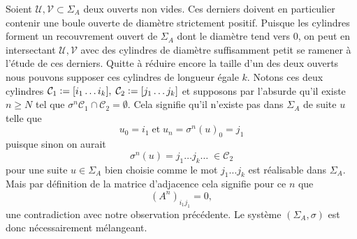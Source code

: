 \documentclass[12pt]{article}
\newcommand{\defeq}{\vcentcolon=}
\begin{document}
Soient $\mathcal{U}, \mathcal{V} \subset \Sigma_{A}$ deux ouverts non vides. Ces derniers doivent en particulier contenir une boule ouverte de diamètre strictement positif. Puisque les cylindres forment un recouvrement ouvert de $\Sigma_{A}$ dont le diamètre tend vers 0, on peut en intersectant $\mathcal{U}, \mathcal{V}$ avec des cylindres de diamètre suffisamment petit se ramener à l'étude de ces derniers. Quitte à réduire encore la taille d'un des deux ouverts nous pouvons supposer ces cylindres de longueur égale $k$. Notons ces deux cylindres $ \mathcal{C}_{1} \defeq [i_{1}\ldots i_{k}], \;\mathcal{C}_{2} \defeq [j_{1}\ldots j_{k}]$ et supposons par l'absurde qu'il existe $n \ge N$ tel que $\sigma^{n}\mathcal{C}_{1} \cap \mathcal{C}_{2} = \emptyset$. Cela signifie qu'il n'existe pas dans $\Sigma_{A}$ de suite $u$ telle que  \[
        u_{0} = i_{1} \; \text{et} \; u_{n} = \sigma^{n}(u)_{0} = j_{1}
\] puisque sinon on aurait \[
\sigma^{n}(u) = j_{1}\ldots j_{k}\ldots \; \in \mathcal{C}_{2} 
\] pour une suite $u \in \Sigma_{A}$ bien choisie comme le mot $j_{1}\ldots j_{k}$ est réalisable dans $\Sigma_{A}$. Mais par définition de la matrice d'adjacence cela signifie pour ce $n$ que  \[
(A^{n})_{i_{1}j_{1}} = 0
,\] une contradiction avec notre observation précédente. Le système $(\Sigma_{A},\sigma)$ est donc nécessairement mélangeant.
\end{document}
